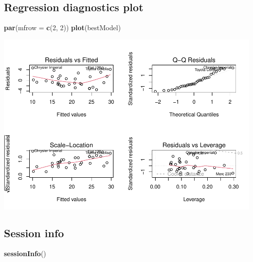\documentclass[
]{article}
\newenvironment{Shaded}{\begin{snugshade}}{\end{snugshade}}
\newcommand{\AttributeTok}[1]{\textcolor[rgb]{0.13,0.29,0.53}{#1}}
\newcommand{\DecValTok}[1]{\textcolor[rgb]{0.00,0.00,0.81}{#1}}
\newcommand{\FunctionTok}[1]{\textcolor[rgb]{0.13,0.29,0.53}{\textbf{#1}}}
\newcommand{\NormalTok}[1]{#1}
\begin{document}
\subsection{Regression diagnostics
plot}\label{regression-diagnostics-plot}

\begin{Shaded}
\begin{Highlighting}[]
\FunctionTok{par}\NormalTok{(}\AttributeTok{mfrow =} \FunctionTok{c}\NormalTok{(}\DecValTok{2}\NormalTok{, }\DecValTok{2}\NormalTok{))}
\FunctionTok{plot}\NormalTok{(bestModel)}
\end{Highlighting}
\end{Shaded}

\includegraphics{Regression-Model-Course-Assignment_files/figure-latex/unnamed-chunk-21-1.pdf}

\subsection{Session info}\label{session-info}

\begin{Shaded}
\begin{Highlighting}[]
\FunctionTok{sessionInfo}\NormalTok{()}
\end{Highlighting}
\end{Shaded}
\end{document}
